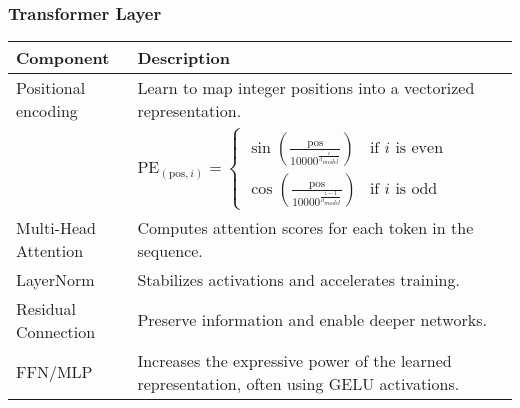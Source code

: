 \subsubsection{Transformer Layer}
\begin{summary}
    \vspace{-1em}
    \begin{center}
        \begin{tabular}{ll}
            \toprule
            \textbf{Component} & \textbf{Description} \\
            \midrule
            Positional encoding & Learn to map integer positions into a vectorized representation. \\
            & $\text{PE}_{(\text{pos},i)} = 
            \begin{cases}
                \sin\left(\frac{\text{pos}}{10000^{\frac{i}{d_{model}}}}\right) & \text{if } i \text{ is even} \\
                \cos\left(\frac{\text{pos}}{10000^{\frac{i-1}{d_{model}}}}\right) & \text{if } i \text{ is odd}
            \end{cases}$ \\
            \midrule
            Multi-Head Attention & Computes attention scores for each token in the sequence. \\
            \midrule
            LayerNorm & Stabilizes activations and accelerates training. \\
            \midrule
            Residual Connection & Preserve information and enable deeper networks. \\
            \midrule
            FFN/MLP & Increases the expressive power of the learned representation, often using GELU activations. \\
            \bottomrule
        \end{tabular}
    \end{center}
\end{summary}
\newpage

